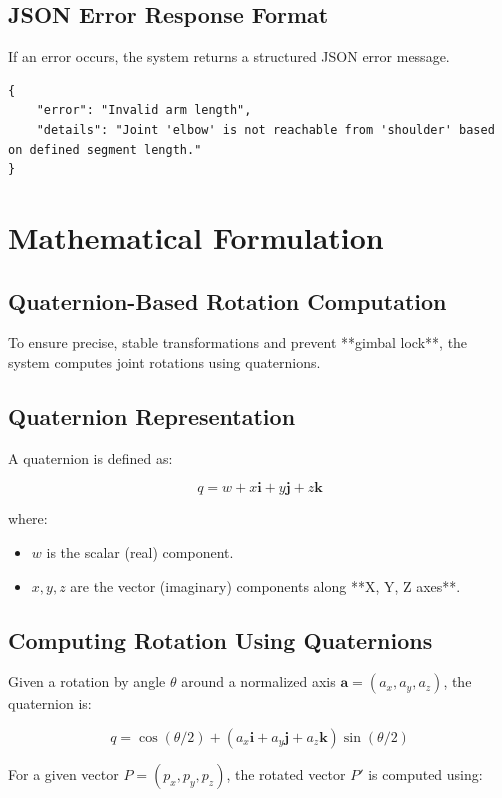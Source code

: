 \documentclass{article}
\begin{document}
\subsection{JSON Error Response Format}
If an error occurs, the system returns a structured JSON error message.

\begin{verbatim}
{
    "error": "Invalid arm length",
    "details": "Joint 'elbow' is not reachable from 'shoulder' based on defined segment length."
}
\end{verbatim}

\section{Mathematical Formulation}
\subsection{Quaternion-Based Rotation Computation}
To ensure precise, stable transformations and prevent **gimbal lock**, the system computes joint rotations using quaternions.

\subsection{Quaternion Representation}
A quaternion is defined as:



\[
q = w + x\mathbf{i} + y\mathbf{j} + z\mathbf{k}
\]



where:
\begin{itemize}
    \item \( w \) is the scalar (real) component.
    \item \( x, y, z \) are the vector (imaginary) components along **X, Y, Z axes**.
\end{itemize}

\subsection{Computing Rotation Using Quaternions}
Given a rotation by angle \( \theta \) around a normalized axis \( \mathbf{a} = (a_x, a_y, a_z) \), the quaternion is:



\[
q = \cos(\theta/2) + (a_x\mathbf{i} + a_y\mathbf{j} + a_z\mathbf{k}) \sin(\theta/2)
\]



For a given vector \( P = (p_x, p_y, p_z) \), the rotated vector \( P' \) is computed using:
\end{document}
